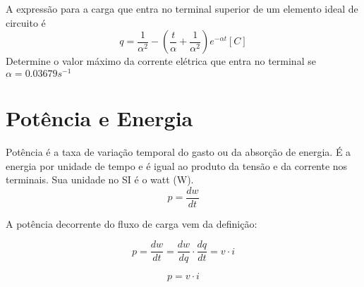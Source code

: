 \begin{exercise}
 A expressão para a carga que entra no terminal superior de um elemento ideal de circuito é
 \[
	q = \frac{1}{\alpha^2} - ( \frac{t}{\alpha} + \frac{1}{\alpha^2} )e^{-\alpha t} [C]
 \]
 Determine o valor máximo da corrente elétrica que entra no terminal se $\alpha = 0.03679 s^{-1}$
\end{exercise}

\section{Potência e Energia}

\begin{definition}[Potência]
 Potência é a taxa de variação temporal do gasto ou da absorção de energia. É a energia por unidade de tempo e é igual ao produto da tensão e da corrente nos terminais. Sua unidade no SI é o watt (W).
 \begin{equation}
  p = \frac{d w}{dt}
 \end{equation}
\end{definition}

A potência decorrente do fluxo de carga vem da definição:

$$ p = \frac{d w}{dt} = \frac{d w}{dq} \cdot \frac{d q}{dt} = v \cdot i $$

\begin{equation}
 p = v \cdot i
\end{equation}